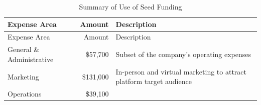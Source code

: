 \documentclass[11pt,openany]{book}
\begin{document}
\begin{longtable}[]{@{}lrl@{}}
\caption{Summary of Use of Seed Funding}\tabularnewline
\toprule
\begin{minipage}[b]{0.28\columnwidth}\raggedright
Expense Area\strut
\end{minipage} & \begin{minipage}[b]{0.13\columnwidth}\raggedleft
Amount\strut
\end{minipage} & \begin{minipage}[b]{0.50\columnwidth}\raggedright
Description\strut
\end{minipage}\tabularnewline
\midrule
\endfirsthead
\toprule
\begin{minipage}[b]{0.28\columnwidth}\raggedright
Expense Area\strut
\end{minipage} & \begin{minipage}[b]{0.13\columnwidth}\raggedleft
Amount\strut
\end{minipage} & \begin{minipage}[b]{0.50\columnwidth}\raggedright
Description\strut
\end{minipage}\tabularnewline
\midrule
\endhead
\begin{minipage}[t]{0.28\columnwidth}\raggedright
General \& Administrative\strut
\end{minipage} & \begin{minipage}[t]{0.13\columnwidth}\raggedleft
\$57,700\strut
\end{minipage} & \begin{minipage}[t]{0.50\columnwidth}\raggedright
Subset of the company's operating expenses\strut
\end{minipage}\tabularnewline
\begin{minipage}[t]{0.28\columnwidth}\raggedright
Marketing\strut
\end{minipage} & \begin{minipage}[t]{0.13\columnwidth}\raggedleft
\$131,000\strut
\end{minipage} & \begin{minipage}[t]{0.50\columnwidth}\raggedright
In-person and virtual marketing to attract platform target
audience\strut
\end{minipage}\tabularnewline
\begin{minipage}[t]{0.28\columnwidth}\raggedright
Operations\strut
\end{minipage} & \begin{minipage}[t]{0.13\columnwidth}\raggedleft
\$39,100\strut
\end{minipage} & \begin{minipage}[t]{0.50\columnwidth}\raggedright

\end{minipage}
\end{longtable}
\end{document}
